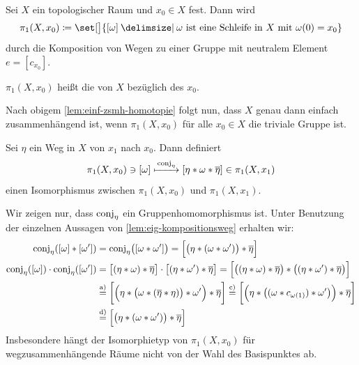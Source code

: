 \begin{korollarB}[{name=[Gruppenstruktur für Homotopieklassen von Schleifen]}]
	Sei $X$ ein topologischer Raum und $x_0 \in X$ fest. Dann wird 
	\[
		\pi_1 (X, x_0) \coloneqq \set[\big]{[\omega] \given \omega \text{ ist eine Schleife in }X \text{ mit } \omega(0)= x_0} 
	\]
	durch die Komposition von Wegen zu einer Gruppe mit neutralem Element $e= [c_{x_0}]$.
\end{korollarB}

\begin{definition}[{name=[Fundamentalgruppe]}]
	$\pi_1(X, x_0)$ heißt die  von $X$ bezüglich des  $x_0$.
\end{definition}

Nach obigem \cref{lem:einf-zsmh-homotopie} folgt nun, dass $X$ genau dann einfach zusammenhängend ist, wenn $\pi_1(X,x_0)$ für alle $x_0 \in X$ die triviale Gruppe ist.

\begin{bemerkung}
	Sei $\eta$ ein Weg in $X$ von $x_1$ nach $x_0$. Dann definiert
	\[
		\pi_1(X,x_0) \ni [\omega] \xmapsto{\, \conj_\eta} \benbrace*{\eta * \omega * \overline{\eta}}  \in \pi_1(X,x_1)
	\]
	einen Isomorphismus zwischen $\pi_1(X,x_0)$ und $\pi_1(X,x_1)$. 
\end{bemerkung}
\begin{beweis}
	Wir zeigen nur, dass $\conj_\eta$ ein Gruppenhomomorphismus ist.
	Unter Benutzung der einzelnen Aussagen von \cref{lem:eig-kompositionsweg} erhalten wir:
	\begin{align*}
		\conj_\eta \enbrace*{ \benbrace*{\omega} * \benbrace*{\omega'}} &= \conj_\eta \enbrace[\big]{ \benbrace*{\omega * \omega'}} = \benbrace[\Big]{ \enbrace[\big]{\eta * (\omega * \omega')} * \overline{\eta}  }  \\
		\conj_\eta \enbrace*{[\omega]} \cdot \conj_\eta \enbrace*{[\omega']} &= \benbrace[\big]{(\eta * \omega) * \overline{\eta} } \cdot  \benbrace[\big]{(\eta * \omega') * \overline{\eta}} = \benbrace[\Big]{ \enbrace[\big]{ \enbrace*{\eta * \omega}* \overline{\eta}  } * \enbrace[\big]{\enbrace*{\eta * \omega'} * \overline{\eta}  }  } \\
		&\stackrel{\text{a)}}{=} \benbrace[\bigg]{ \enbrace[\Big]{\eta * \enbrace[\big]{\omega * \enbrace*{\overline{\eta} * \eta } }* \omega' } * \overline{\eta}  } 
		\stackrel{\text{c)}}{=} \benbrace[\bigg]{\enbrace[\Big]{ \eta * \enbrace[\big]{\enbrace{\omega * c_{\omega(1)}} * \omega' } } * \overline{\eta}} \\
		&\stackrel{\text{d)}}{=}
		\benbrace[\Big]{\enbrace[\big]{\eta * \enbrace*{\omega * \omega'} } * \overline{\eta}  } 
	\end{align*}
	Insbesondere hängt der Isomorphietyp von $\pi_1(X,x_0)$ für wegzusammenhängende Räume nicht von der Wahl des Basispunktes ab.
\end{beweis}

